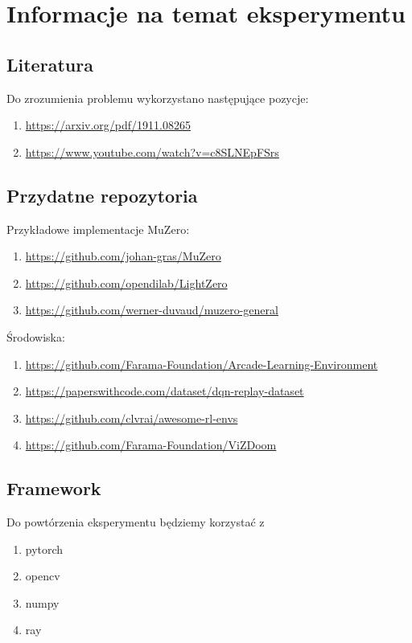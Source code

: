 \section{Informacje na temat eksperymentu}
  \subsection{Literatura}
    Do zrozumienia problemu wykorzystano następujące pozycje:
    \begin{enumerate}
      \item \url{https://arxiv.org/pdf/1911.08265}
      \item \url{https://www.youtube.com/watch?v=c8SLNEpFSrs}
    \end{enumerate}

  \subsection{Przydatne repozytoria}
    Przykładowe implementacje MuZero:
    \begin{enumerate}
      \item \url{https://github.com/johan-gras/MuZero}
      \item \url{https://github.com/opendilab/LightZero}
      \item \url{https://github.com/werner-duvaud/muzero-general}
    \end{enumerate}
    Środowiska:
    \begin{enumerate}
      \item \url{https://github.com/Farama-Foundation/Arcade-Learning-Environment}
      \item \url{https://paperswithcode.com/dataset/dqn-replay-dataset}
      \item \url{https://github.com/clvrai/awesome-rl-envs}
      \item \url{https://github.com/Farama-Foundation/ViZDoom}
    \end{enumerate}
   
  \subsection{Framework}
    Do powtórzenia eksperymentu będziemy korzystać z 
    \begin{enumerate}
      \item pytorch
      \item opencv
      \item numpy
      \item ray
    \end{enumerate}

